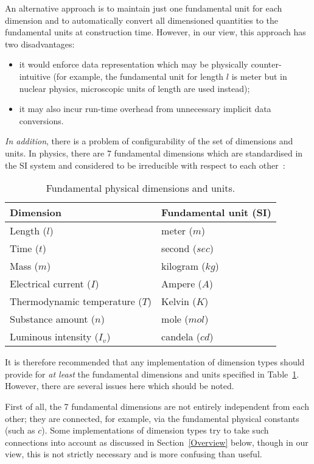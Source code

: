 \documentclass[11pt,a4paper]{article}
\begin{document}
An alternative approach is to maintain just one fundamental unit for each
dimension and to automatically convert all dimensioned quantities to the
fundamental units at construction time. However, in our view, this approach has
two disadvantages:
\begin{itemize}
\item it would enforce data representation which may be physically
	counter-intuitive (for example, the fundamental unit for length $l$ is meter
	but in nuclear physics, microscopic units of length are used instead);
\item it may also incur run-time overhead from unnecessary implicit data
	conversions.
\end{itemize}

\textit{In addition}, there is a problem of configurability of the set of
dimensions and units. In physics, there are 7 fundamental dimensions which are
standardised in the SI system and considered to be irreducible with respect to
each other~\cite{SI}:

\begin{table}[ht!]
\begin{center}
\begin{tabular}{||l|l||}
\hline
Dimension												& Fundamental unit (SI)	\\ \hline \hline
Length ($l$)										& meter  ($m$)					\\ \hline
Time ($t$)											& second ($sec$)				\\ \hline
Mass ($m$)											& kilogram ($kg$)				\\ \hline
Electrical current ($I$)				& Ampere ($A$)					\\ \hline
Thermodynamic temperature ($T$)	&	Kelvin ($K$)					\\ \hline
Substance amount ($n$)					& mole ($mol$)					\\ \hline
Luminous intensity ($I_v$)			& candela ($cd$)				\\ \hline
\end{tabular}
\caption{Fundamental physical dimensions and units.\label{TabFund}}
\end{center}
\end{table}

It is therefore recommended that any implementation of dimension types should
provide for \textit{at least} the fundamental dimensions and units specified in
Table~\ref{TabFund}. However, there are several issues here which should be
noted.

First of all, the 7 fundamental dimensions are not entirely independent from
each other; they are connected, for example, via the fundamental physical
constants (such as $c$). Some implementations of dimension types try to take
such connections into account as discussed in Section~\ref{Overview} below,
though in our view, this is not strictly necessary and is more confusing than
useful.
\end{document}

